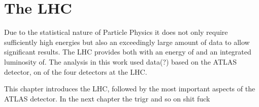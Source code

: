 \section{The LHC}

Due to the statistical nature of Particle Physics it does not only require sufficiently high energies but also an exceedingly large amount of data to allow significant results.
The LHC provides both with an energy of and an integrated luminosity of.
The analysis in this work used data(?) based on the ATLAS detector, on of the four detectors at the LHC.

This chapter introduces the LHC, followed by the most important aspects of the ATLAS detector. In the next chapter the trigr and so on shit fuck